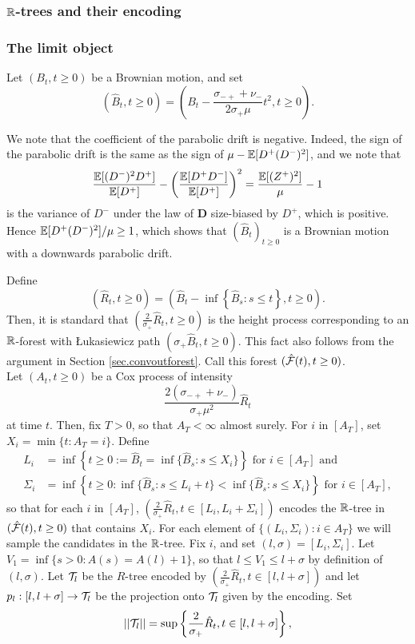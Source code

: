 \subsubsection{\texorpdfstring{${\mathbb R}$}{R}-trees and their encoding}


\subsubsection{The limit object}\label{subsubsec.samplecontinuousobject}
Let $(B_t,t\geq 0)$ be a Brownian motion, and set $$\left(\hat{B}_t,t\geq 0\right)=\left(B_t-\frac{\sigma_{-+}+\nu_-}{2\sigma_+\mu}t^2,t\geq 0\right).$$ 
\begin{remark}
We note that the coefficient of the parabolic drift is negative. Indeed, the sign of the parabolic drift is the same as the sign of $\mu-{\mathbb E}[D^+(D^-)^2]$, and we note that
$$\frac{{\mathbb E}[(D^-)^2D^+]}{{\mathbb E}[D^+]}-\left(\frac{{\mathbb E}[D^+D^-]}{{\mathbb E}[D^+]}\right)^2=\frac{{\mathbb E}[(Z^+)^2]}{\mu}-1$$
is the variance of $D^-$ under the law of $\mathbf{D}$ size-biased by $D^+$, which is positive. Hence ${\mathbb E}[D^+(D^-)^2]/\mu\geq 1$, which shows that $(\hat{B}_t)_{t\geq 0}$ is a Brownian motion with a downwards parabolic drift.
\end{remark}
Define 
$$(\hat{R}_t,t\geq 0)= \left(\hat{B}_t-\inf\left\{\hat{B}_s: s\leq t\right\},t\geq 0\right).$$
Then, it is standard that $\left(\frac{2}{\sigma_+}\hat{R}_t,t\geq 0\right)$ is the height process corresponding to an ${\mathbb R}$-forest with \L ukasiewicz path $\left(\sigma_+\hat{B}_t,t\geq 0\right)$.  This fact also follows from the argument in Section \ref{sec.convoutforest}. Call this forest $(\hat{{\mathcal F}}(t),t\geq 0)$. \\
Let $(A_t,t\geq 0)$ be a Cox process of intensity $$\frac{2(\sigma_{-+}+\nu_-)}{\sigma_+\mu^2} \hat{R}_t$$ at time $t$. Then, fix $T>0$, so that $A_T<\infty$ almost surely. For $i$ in $\left[A_T\right]$, set $X_i=\min\{t:A_T=i\}$. Define
\begin{align*}
L_i&=\inf\left\{t\geq 0:=\hat{B}_t=\inf\{\hat{B}_s:s\leq X_i\}\right\}\text{ for }i\in \left[A_T\right]\text{ and}\\
\Sigma_i&=\inf\left\{ t\geq 0: \inf\{\hat{B}_s:s\leq L_i+t\} < \inf\{\hat{B}_s:s\leq X_i\}\right\}\text{ for }i\in \left[A_T\right],
\end{align*}
so that for each $i$ in $\left[A_T\right]$, $\left(\frac{2}{\sigma_+}\hat{R}_t,t\in [L_i,L_i+\Sigma_i]\right)$ encodes the ${\mathbb R}$-tree in $(\hat{{\mathcal F}}(t),t\geq 0)$ that contains $X_i$. For each element of $\{(L_i,\Sigma_i):i\in A_T\}$ we will sample the candidates in the ${\mathbb R}$-tree. Fix $i$, and set $(l,\sigma)=[L_i,\Sigma_i]$. Let $V_1=\inf\{s>0:A(s)=A(l)+1\}$, so that $l\leq V_1\leq l+\sigma$ by definition of $(l,\sigma)$. Let ${\mathcal T}_l$ be the $R$-tree encoded by $\left(\frac{2}{\sigma_+}\hat{R}_t,t\in [l,l+\sigma]\right)$ and let $p_l:[l,l+\sigma]\to {\mathcal T}_l$ be the projection onto ${\mathcal T}_l$ given by the encoding. Set $$||{\mathcal T}_l||=\sup\left\{\frac{2}{\sigma_+}\hat{R}_t,t\in [l,l+\sigma]\right\},$$
